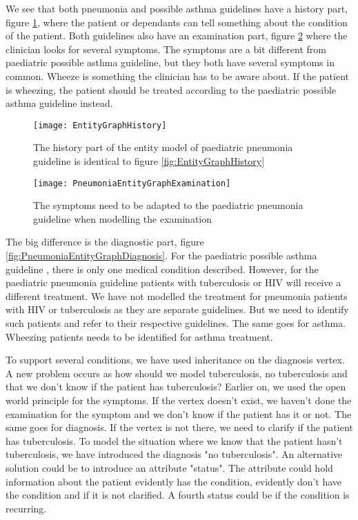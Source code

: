 We see that both pneumonia and possible asthma guidelines have a history part, figure \ref{fig:PneumoniaEntityGraphHistory}, where the patient or dependants can tell something about the condition of the patient. Both guidelines also have an examination part, figure \ref{fig:PneumoniaEntityGraphExamination} where the clinician looks for several symptoms. The symptoms are a bit different from paediatric possible asthma guideline, but they both have several symptoms in common. Wheeze is something the clinician has to be aware about. If the patient is wheezing, the patient should be treated according to the paediatric possible asthma guideline instead.

\begin{figure}[h!]
	\texttt{[image: EntityGraphHistory]}
	\caption {The history part of the entity model of paediatric pneumonia guideline \parencite{RepublicofKeny2016} is identical to figure \ref{fig:EntityGraphHistory}}
	\label{fig:PneumoniaEntityGraphHistory}
\end{figure}

\begin{figure}[h!]
	\texttt{[image: PneumoniaEntityGraphExamination]}
	\caption {The symptoms need to be adapted to the paediatric pneumonia guideline \parencite{RepublicofKeny2016} when modelling the examination}
	\label{fig:PneumoniaEntityGraphExamination}
\end{figure}

The big difference is the diagnostic part, figure \ref{fig:PneumoniaEntityGraphDiagnosis}. For the paediatric possible asthma guideline \parencite{RepublicofKeny2016}, there is only one medical condition described. However, for the paediatric pneumonia guideline \parencite{RepublicofKeny2016} patients with tuberculosis or HIV will receive a different treatment. We have not modelled the treatment for pneumonia patients with HIV or tuberculosis as they are separate guidelines. But we need to identify such patients and refer to their respective guidelines. The same goes for asthma. Wheezing patients needs to be identified for asthma treatment.

To support several conditions, we have used inheritance on the diagnosis vertex. A new problem occurs as how should we model tuberculosis, no tuberculosis and that we don't know if the patient has tuberculosis? Earlier on, we used the open world principle for the symptoms. If the vertex doesn't exist, we haven't done the examination for the symptom and we don't know if the patient has it or not. The same goes for diagnosis. If the vertex is not there, we need to clarify if the patient has tuberculosis. To model the situation where we know that the patient hasn't tuberculosis, we have introduced the diagnosis "no tuberculosis". An alternative solution could be to introduce an attribute "status". The attribute could hold information about the patient evidently has the condition, evidently don't have the condition and if it is not clarified. A fourth status could be if the condition is recurring.


